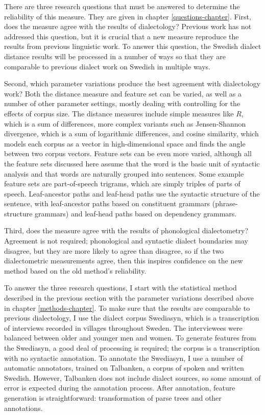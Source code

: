 There are three research questions that must be answered to determine
the reliability of this measure. They are given in chapter
\ref{questions-chapter}. First, does the measure agree with the
results of dialectology? Previous work has not addressed this
question, but it is crucial that a new measure reproduce the results
from previous linguistic work. To answer this question, the
Swedish dialect distance results will be processed in a number of ways
so that they are comparable to previous dialect work on Swedish in
multiple ways.

Second, which parameter variations produce the best agreement with
dialectology work? Both the distance measure and feature set can be
varied, as well as a number of other parameter settings, mostly
dealing with controlling for the effects of corpus size. The distance
measures include simple measures like $R$, which is a sum of differences, more
complex variants such as Jensen-Shannon divergence, which is a sum of
logarithmic differences, and cosine similarity, which models each
corpus as a vector in high-dimensional space and finds the angle
between two corpus vectors. Feature sets can be even more varied,
although all the feature sets discussed here assume that the word is the
basic unit of syntactic analysis and that words are naturally grouped
into sentences. Some example feature sets are part-of-speech trigrams,
which are simply triples of parts of speech. Leaf-ancestor paths and
leaf-head paths use the syntactic structure of the sentence, with
leaf-ancestor paths based on constituent grammars (phrase-structure
grammars) and leaf-head paths based on dependency grammars.

Third, does the measure agree with the results of phonological
dialectometry? Agreement is not required; phonological and syntactic
dialect boundaries may disagree, but they are more likely to agree
than disagree, so if the two dialectometric measurements agree, then
this inspires confidence on the new method based on the old method's
reliability.

To answer the three research questions, I start with the statistical
method described in the previous section with the parameter variations
described above in chapter \ref{methods-chapter}. To make sure that
the results are comparable to previous dialectology, I use the dialect
corpus Swediasyn, which is a transcription of interviews recorded
in villages throughout Sweden. The interviewees were balanced
between older and younger men and women. To generate features from the
Swediasyn, a good deal of processing is required; the corpus is a
transcription with no syntactic annotation. To annotate the Swediasyn,
I use a number of automatic annotators, trained on Talbanken, a corpus
of spoken and written Swedish. However, Talbanken does not include
dialect sources, so some amount of error is expected during the
annotation process. After annotation, feature generation is
straightforward: transformation of parse trees and other annotations.

